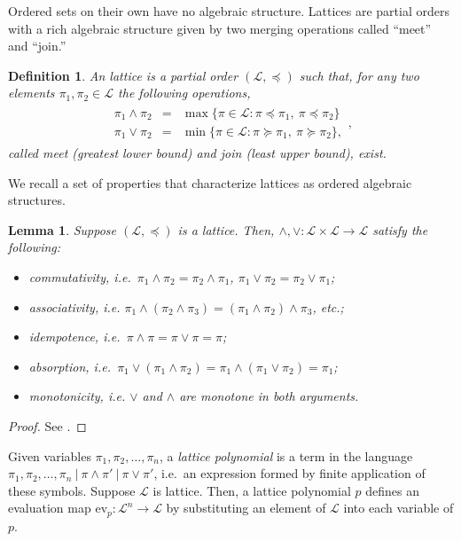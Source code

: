 \documentclass[conference]{ieeeconf}
\renewcommand{\L}{\mathcal{L}}
\newcommand{\join}{\vee}
\newcommand{\meet}{\wedge}
\newtheorem{lemma}{Lemma}
\newtheorem{definition}{Definition}
\begin{document}
Ordered sets on their own have no algebraic structure. Lattices are partial orders with a rich algebraic structure given by two merging operations called ``meet'' and ``join.''
 
\begin{definition} \label{def:lattice}
    An \emph{lattice} is a partial order $(\L, \preceq)$ such that, for any two elements $\pi_1, \pi_2 \in \L$ the following operations,
    \begin{align*}
        \begin{aligned}
        \pi_1 \meet \pi_2 &=& \max\{ \pi \in \L: \pi \preceq \pi_1,~\pi \preceq \pi_2 \} \\
        \pi_1 \join \pi_2 &=& \min\{ \pi \in \L: \pi \succeq \pi_1,~\pi \succeq \pi_2 \},       
        \end{aligned},
    \end{align*}
    called \emph{meet} (greatest lower bound) and \emph{join} (least upper bound), exist. 
\end{definition}

We recall a set of properties that characterize lattices as ordered algebraic structures.

\begin{lemma} \label{lem:lattice-axiom} 
    Suppose $(\L,\preceq)$ is a lattice. Then, $\meet, \join: \L \times \L \to \L$ satisfy the following:
    \begin{itemize}
        \item[(i)] \emph{commutativity}, i.e.~$\pi_1 \meet \pi_2 = \pi_2 \meet \pi_1$, $\pi_1 \join \pi_2 = \pi_2 \join \pi_1$;
        \item[(ii)] \emph{associativity}, i.e. {\small $\pi_1 \meet (\pi_2 \meet \pi_3) = (\pi_1 \meet \pi_2) \meet \pi_3$}, etc.;
        \item[(iii)] \emph{idempotence}, i.e.~$\pi \meet \pi = \pi \join \pi =  \pi$;
        \item[(iv)] \emph{absorption}, i.e.~$\pi_1 \join \left( \pi_1 \meet \pi_2 \right) = \pi_1 \meet \left( \pi_1 \join \pi_2 \right) = \pi_1$;
        \item[(v)] \emph{monotonicity}, i.e. $\join$ and $\meet$ are monotone in both arguments.
    \end{itemize}
\end{lemma}
\begin{proof}
    See \cite[\S I.4 Lemma 1, \S I.5 Lemma 3]{birkhoff1940}.
\end{proof}

Given variables $\pi_1,\pi_2,\dots,\pi_n$, a \emph{lattice polynomial} is a term in the language $\pi_1,\pi_2,\dots,\pi_n~\vert~\pi \meet \pi'~\vert~\pi \join \pi'$, i.e.~an expression formed by finite application of these symbols. Suppose $\L$ is  lattice. Then, a lattice polynomial $p$ defines an evaluation map $\mathrm{ev}_p: \L^n \to \L$ by substituting an element of $\L$ into each variable of $p$.
\end{document}
